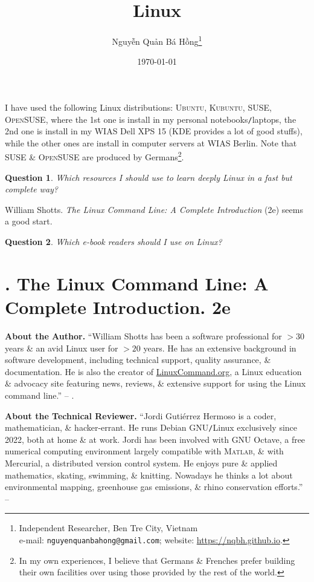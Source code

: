 \documentclass[oneside]{book}
\title{Linux}
\author{\selectlanguage{vietnamese} Nguyễn Quản Bá Hồng\footnote{Independent Researcher, Ben Tre City, Vietnam\\e-mail: \texttt{nguyenquanbahong@gmail.com}; website: \url{https://nqbh.github.io}.}}
\date{\today}
\numberwithin{equation}{section}
\newtheorem{question}{Question}[chapter]
\begin{document}
\maketitle
\tableofcontents

I have used the following Linux distributions: \textsc{Ubuntu, Kubuntu, SUSE, OpenSUSE}, where the 1st one is install in my personal notebooks\texttt{/}laptops, the 2nd one is install in my WIAS Dell XPS 15 (KDE provides a lot of good stuffs), while the other ones are install in computer servers at WIAS Berlin. Note that SUSE \& \textsc{OpenSUSE} are produced by Germans\footnote{In my own experiences, I believe that Germans \& Frenches prefer building their own facilities over using those provided by the rest of the world.}.

\begin{question}
	Which resources I should use to learn deeply Linux in a fast but complete way?
\end{question}
William Shotts. \textit{The Linux Command Line: A Complete Introduction} (2e) seems a good start.

\begin{question}
	Which e-book readers should I use on Linux?
\end{question}


\chapter{\cite{Shotts2019}. The Linux Command Line: A Complete Introduction. 2e}

\textbf{About the Author.} ``William Shotts has been a software professional for $> 30$ years \& an avid Linux user for $> 20$ years. He has an extensive background in software development, including technical support, quality assurance, \& documentation. He is also the creator of \url{LinuxCommand.org}, a Linux education \& advocacy site featuring news, reviews, \& extensive support for using the Linux command line.'' -- \cite[p. 6]{Shotts2019}.

\noindent\textbf{About the Technical Reviewer.} ``Jordi Guti\'errez Hermoso is a coder, mathematician, \& hacker-errant. He runs Debian GNU\texttt{/}Linux exclusively since 2022, both at home \& at work. Jordi has been involved with GNU Octave, a free numerical computing environment largely compatible with \textsc{Matlab}, \& with Mercurial, a distributed version control system. He enjoys pure \& applied mathematics, skating, swimming, \& knitting. Nowadays he thinks a lot about environmental mapping, greenhouse gas emissions, \& rhino conservation efforts.'' -- \cite[p. 7]{Shotts2019}
\end{document}
